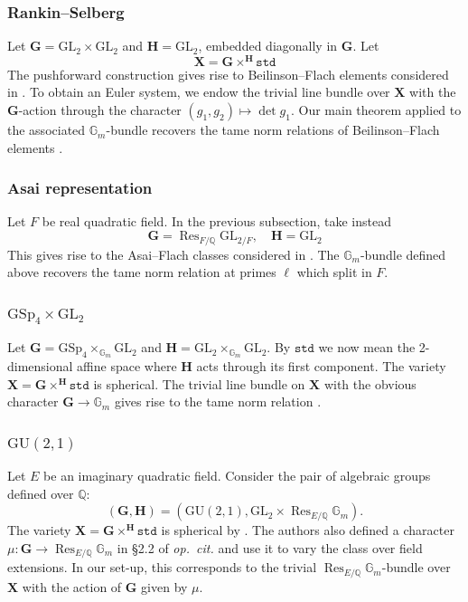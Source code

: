 \documentclass{amsart}
\theoremstyle{definition}
\theoremstyle{remark}
\newcommand{\1}{\mathbf{1}}
\newcommand{\G}{\mathbf{G}}
\newcommand{\GL}{\mathrm{GL}}
\newcommand{\mb}[1]{\mathbf{#1}}
\newcommand{\Q}{\mathbb{Q}}
\DeclareMathOperator{\Res}{Res}
\theoremstyle{definition}
\renewcommand{\G}{\mathbb{G}}
\newcommand{\bH}{\mathbf{H}}
\newcommand{\bG}{\mathbf{G}}
\begin{document}
\subsubsection{Rankin--Selberg \cite{LLZ}}
Let $\bG=\GL_2\times\GL_2$ and $\bH=\GL_2$, embedded diagonally in $\bG$. Let
\[
    \mb{X}=\bG\times^{\bH}\mathtt{std}
\]
The pushforward construction gives rise to Beilinson--Flach elements considered in \cite{LLZ}. To obtain an Euler system, we endow the trivial line bundle over $\mb{X}$ with the $\bG$-action through the character $(g_1,g_2)\mapsto\det g_1$. Our main theorem applied to the associated $\G_m$-bundle recovers the tame norm relations of Beilinson--Flach elements \cite[Theorem 3.4.1]{LLZ}.

\subsubsection{Asai representation \cite{GrossiAF}}
Let $F$ be real quadratic field. In the previous subsection, take instead
\[
    \bG=\Res_{F/\Q}\GL_{2/F},\quad \bH=\GL_2
\]
This gives rise to the Asai--Flach classes considered in \cite{GrossiAF}. The $\G_m$-bundle defined above recovers the tame norm relation at primes $\ell$ which split in $F$.

\subsubsection{$\mathrm{GSp}_4\times\GL_2$ \cite{HJS}}
Let $\bG=\mathrm{GSp}_4\times_{\G_m}\GL_2$ and $\bH=\GL_2\times_{\G_m}\GL_2$. By $\mathtt{std}$ we now mean the 2-dimensional affine space where $\bH$ acts through its first component. The variety $\mb{X}=\bG\times^\bH\mathtt{std}$ is spherical. The trivial line bundle on $\mb{X}$ with the obvious character $\bG\to\G_m$ gives rise to the tame norm relation \cite[Proposition 8.17]{HJS}.

\subsubsection{$\mathrm{GU}(2,1)$ \cite{LSZ-U3}}
Let $E$ be an imaginary quadratic field. Consider the pair of algebraic groups defined over $\Q$:
\[
    (\bG,\bH)=(\mathrm{GU}(2,1), \GL_2\times\Res_{E/\Q}\G_m).
\]
The variety $\mb{X}=\bG\times^\bH\mathtt{std}$ is spherical by \cite[Lemma 2.5.1]{LSZ-U3}. The authors also defined a character $\mu:\bG\to\Res_{E/\Q}\G_m$ in \S 2.2 of \emph{op.~cit.} and use it to vary the class over field extensions. In our set-up, this corresponds to the trivial $\Res_{E/\Q}\G_m$-bundle over $\mb{X}$ with the action of $\mb{G}$ given by $\mu$.
\end{document}
